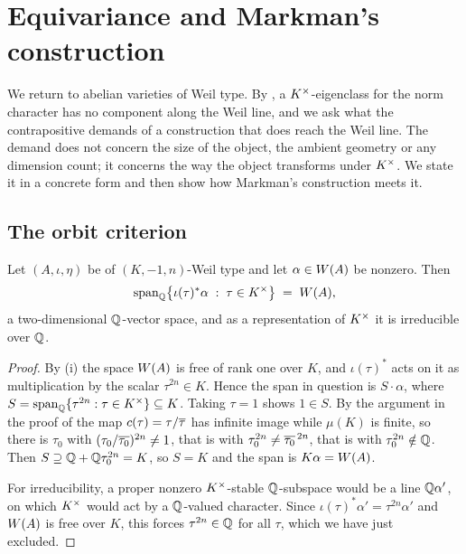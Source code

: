 \section{Equivariance and Markman's construction}
\label{sec:escape}

We return to abelian varieties of Weil type. By , a
$K^{\times}$-eigenclass for the norm character has no component along the Weil line,
and we ask what the contrapositive demands of a construction that does reach
the Weil line. The demand does not concern the size of the object, the ambient
geometry or any dimension count; it concerns the way the object transforms
under $K^{\times}$. We state it in a concrete form and then show how Markman's
construction meets it.

\subsection{The orbit criterion}

\begin{proposition}\label{prop:orbitplane}
Let $(A,\iota,\eta)$ be of $(K,-1,n)$-Weil type and let $\alpha\in W(A)$ be
nonzero. Then
\[
  \mathrm{span}_{\mathbb{Q}}\bigl\{\iota(\tau)^{*}\alpha\;:\;\tau\in K^{\times}\bigr\}
  \;=\;W(A),
\]
a two-dimensional $\mathbb{Q}$-vector space, and as a representation of $K^{\times}$ it is
irreducible over $\mathbb{Q}$.
\end{proposition}

\begin{proof}
By (i) the space $W(A)$ is free of rank one over $K$, and
$\iota(\tau)^{*}$ acts on it as multiplication by the scalar $\tau^{2n}\in K$.
Hence the span in question is $S\cdot\alpha$, where
$S=\mathrm{span}_{\mathbb{Q}}\{\tau^{2n}:\tau\in K^{\times}\}\subseteq K$. Taking $\tau=1$
shows $1\in S$. By the argument in the proof of  the map
$c(\tau)=\tau/\overline{\tau}$ has infinite image while $\mu(K)$ is finite, so there
is $\tau_{0}$ with $(\tau_{0}/\overline{\tau_{0}})^{2n}\ne1$, that is with
$\tau_{0}^{2n}\ne\overline{\tau_{0}}^{\,2n}$, that is with $\tau_{0}^{2n}\notin\mathbb{Q}$.
Then $S\supseteq\mathbb{Q}+\mathbb{Q}\tau_{0}^{2n}=K$, so $S=K$ and the span is
$K\alpha=W(A)$.

For irreducibility, a proper nonzero $K^{\times}$-stable $\mathbb{Q}$-subspace would be a
line $\mathbb{Q}\alpha'$, on which $K^{\times}$ would act by a $\mathbb{Q}$-valued character. Since
$\iota(\tau)^{*}\alpha'=\tau^{2n}\alpha'$ and $W(A)$ is free over $K$, this forces
$\tau^{2n}\in\mathbb{Q}$ for all $\tau$, which we have just excluded.
\end{proof}

